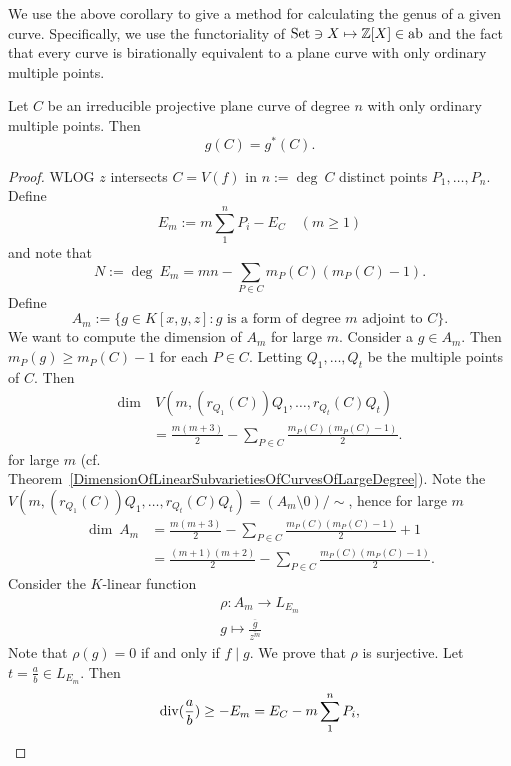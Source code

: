     We use the above corollary to give a method for calculating the genus of a given curve. Specifically, we use the functoriality of $\mathrm{Set}\ni X \mapsto \mathbb{Z}[X]\in \mathrm{ab}$ and the fact that every curve is birationally equivalent to a plane curve with only ordinary multiple points. 
    \begin{proposition}\label{FormulaForGenusOfCurveWithOnlyOrdinaryMultiplePoints}
        Let $C$ be an irreducible projective plane curve of degree $n$ with only ordinary multiple points. Then 
        $$
            g(C) = g^\ast(C).
        $$ 
    \end{proposition}
    \begin{proof}
        WLOG $z$ intersects $C=V(f)$ in $n := \deg \ C$ distinct points $P_1,\dots,P_n$. Define 
        $$
            E_m := m\sum_1^n P_i - E_C \quad (m\geq 1)
        $$
        and note that 
        $$
            N:= \deg \ E_m = mn - \sum_{P\in C} m_P(C)(m_P(C)-1).
        $$
        Define 
        $$
            A_m := \{ g\in K[x,y,z] : g \text{ is a form of degree } m \text{ adjoint to } C\}.
        $$
        We want to compute the dimension of $A_m$ for large $m$. Consider a $g\in A_m$. Then $m_P(g)\geq m_P(C)-1$ for each $P\in C$. Letting $Q_1,\dots,Q_t$ be the multiple points of $C$. Then 
        \begin{align*}
            \dim& \ V(m,(r_{Q_1}(C))Q_1,\dots,r_{Q_t}(C)Q_t) \\ &= \frac{m(m+3)}{2}-\sum_{P\in C} \frac{m_P(C)(m_P(C)-1)}{2}.
        \end{align*}
        for large $m$ (cf. Theorem~\ref{DimensionOfLinearSubvarietiesOfCurvesOfLargeDegree}). Note the $V(m,(r_{Q_1}(C))Q_1,\dots,r_{Q_t}(C)Q_t)= (A_m\setminus 0)/\sim$, hence for large $m$
        \begin{align*}
            \dim \ A_m &= \frac{m(m+3)}{2}-\sum_{P\in C} \frac{m_P(C)(m_P(C)-1)}{2} +1\\ 
            &= \frac{(m+1)(m+2)}{2}-\sum_{P\in C} \frac{m_P(C)(m_P(C)-1)}{2}.
        \end{align*} 
        Consider the $K$-linear function
        \begin{gather*}
            \rho : A_m \rightarrow L_{E_m}\\
            g\mapsto \frac{\overline{g}}{\overline{z^m}}
        \end{gather*}
        Note that $\rho(g)=0$ if and only if $f\mid g$. We prove that $\rho$ is surjective. Let $t=\frac{a}{b}\in L_{E_m}$. Then 
        $$
            \mathrm{div}(\frac{a}{b})\geq -E_m = E_C-m\sum_1^n P_i,
$$
\end{proof}
